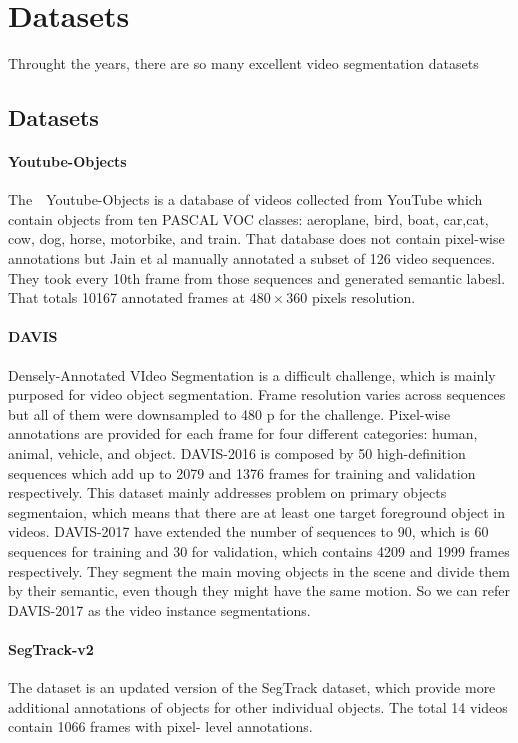 \section{Datasets}
Throught the years,  there are so many excellent video segmentation datasets
\subsection{Datasets}
\paragraph{Youtube-Objects~\cite{Youtube}} 
The　Youtube-Objects is a database of videos collected from YouTube which contain objects from ten PASCAL VOC classes: 
aeroplane, bird, boat, car,cat, cow, dog, horse, motorbike, and train.
 That database does not contain pixel-wise annotations but Jain et al 
manually annotated a subset of 126 video sequences.
They took every 10th frame from those sequences and generated semantic labesl. 
That totals 10167 annotated frames at $480\times 360$ pixels resolution.

\paragraph{DAVIS}

Densely-Annotated VIdeo Segmentation is a  difficult challenge, which is mainly purposed for video object segmentation.
Frame resolution varies across sequences but all of them were downsampled to 480 p for the challenge. 
Pixel-wise annotations are provided for each frame for four different categories: human, animal, vehicle, and object.
DAVIS-2016 \cite{DAVIS2016}is composed by 50 high-definition sequences which add up to 2079 and 1376 frames for training and validation respectively.
This dataset mainly addresses problem on primary objects segmentaion, which means that there are at least one target foreground object in videos.
DAVIS-2017 \cite{DAVIS2017} have extended the number of sequences to 90, which is 60 sequences for training and 30 for validation, which contains 4209 and 1999 frames respectively.
They segment the main moving objects in the scene and divide them by their semantic, even though they might have the same motion. So we can refer DAVIS-2017 as the video instance segmentations.

\paragraph{SegTrack-v2~\cite{SegTrack}}
The dataset is an updated version of the SegTrack dataset, which provide more additional
annotations of objects for other individual objects. The total 14 videos contain 1066 frames with pixel-
level annotations. 


